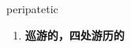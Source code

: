
\begin{frame}
{\huge peripatetic}
\begin{center}
\begin{enumerate}\Large
  \item \textbf{巡游的，四处游历的}
\end{enumerate}
\end{center}
\end{frame}
